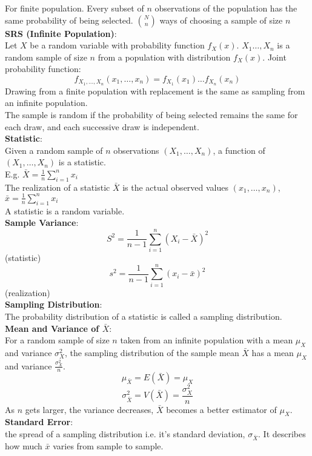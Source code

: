 \documentclass{article}
\begin{document}
\begin{multicols*}{3}
For finite population. Every subset of $n$ observations of the population has the same probability of being selected. $N\choose n$ ways of choosing a sample of size $n$\\
\textbf{SRS (Infinite Population)}:\\
Let $X$ be a random variable with probability function $f_X(x)$. $X_1\dots,X_n$ is a random sample of size $n$ from a population with distribution $f_X(x)$. Joint probability function: $$f_{X_1,\dots,X_n}(x_1,\dots,x_n)=f_{X_1}(x_1)\dots f_{X_n}(x_n)$$
Drawing from a finite population with replacement is the same as sampling from an infinite population. \\
The sample is random if the probability of being selected remains the same for each draw, and each successive draw is independent.\\
\textbf{Statistic}: \\
Given a random sample of $n$ observations $(X_1,\dots,X_n)$, a function of $(X_1,\dots,X_n)$ is a statistic.\\
E.g. $\bar{X}=\frac{1}{n}\sum_{i=1}^n x_i$\\
The realization of a statistic $\bar{X}$ is the actual observed values $(x_1,\dots,x_n)$, $\bar{x}=\frac{1}{n}\sum_{i=1}^nx_i$\\
A statistic is a random variable.\\
\textbf{Sample Variance}:\\
$$S^2=\frac{1}{n-1}\sum_{i=1}^n(X_i-\bar{X})^2$$ (statistic)
$$s^2=\frac{1}{n-1}\sum_{i=1}^n(x_i-\bar{x})^2$$ (realization)\\
\textbf{Sampling Distribution}:\\
The probability distribution of a statistic is called a sampling distribution. \\
\textbf{Mean and Variance of $\bar{X}$}:\\
For a random sample of size $n$ taken from an infinite population with a mean $\mu_X$ and variance $\sigma_X^2$, the sampling distribution of the sample mean $\bar{X}$ has a mean $\mu_X$ and variance $\frac{\sigma_X^2}{n}$.
$$\mu_{\bar{X}}=E(\bar{X})=\mu_X$$
$$\sigma_{\bar{X}}^2=V(\bar{X})=\frac{\sigma_X^2}{n}$$
As $n$ gets larger, the variance decreases, $\bar{X}$ becomes a better estimator of $\mu_X$.\\
\textbf{Standard Error}:\\
the spread of a sampling distribution i.e. it's standard deviation, $\sigma_{\bar{X}}$. It describes how much $\bar{x}$ varies from sample to sample. \\

\end{multicols*}
\end{document}
